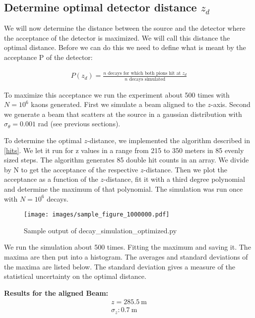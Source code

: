 \documentclass[12pt,a4paper,oneside,english]{article}
\begin{document}
	
\subsection{Determine optimal detector distance $z_d$}
We will now determine the distance between the source and the detector where the acceptance of the detector is maximized. We will call this distance the optimal distance. Before we can do this we need to define what is meant by the acceptance P of the detector:
	
	\begin{align}
		P(z_d) = \frac{\text{$n$ decays for which both pions hit at $z_d$}}{\text{$n$ decays simulated}} 
	\end{align}
	
To maximize this acceptance we run the experiment about 500 times with $N = 10^6 $ kaons generated. First we simulate a beam aligned to the $z$-axis. Second we generate a beam that scatters at the source in a gaussian distribution with $\sigma _{\theta} = 0.001$ rad (see previous sections). 
	
To determine the optimal $z$-distance, we implemented the algorithm described in \ref{hits}. We let it run for z values in a range from 215 to 350 meters in 85 evenly sized steps. The algorithm generates 85 double hit counts in an array. We divide by N to get the acceptance of the respective $z$-distance. Then we plot the acceptance as a function of the $z$-distance, fit it with a third degree polynomial and determine the maximum of that polynomial. The simulation was run once with $N = 10^6 $ decays.
	
\begin{figure}
	\texttt{[image: images/sample\_figure\_1000000.pdf]}
	\caption{Sample output of decay\_simulation\_optimized.py}
	\label{fig:figure1000000215to350in85562}
\end{figure}
	
We run the simulation about 500 times. Fitting the maximum and saving it. The maxima are then put into a histogram. The averages and standard deviations of the maxima are listed below. The standard deviation gives a measure of the statistical uncertainty on the optimal distance.
	
	
	\textbf{Results for the aligned Beam:}
		\begin{align*}
		z = \SI{285.5}{\meter}\\
		\sigma _z  : \SI{0.7}{\meter}\\
		\end{align*}
	
\end{document}
